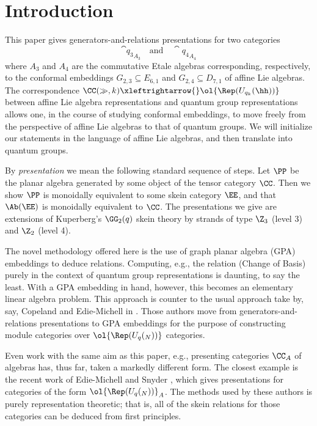\section{Introduction}
This paper gives generators-and-relations presentations for two categories 
\[
    \cat{q_3}_{A_3} \quad \text{and} \quad \cat{q_4}_{A_4}
\] 
where $A_3$ and $A_4$ are the commutative Etale algebras corresponding, respectively, 
to the conformal embeddings $G_{2,3} \subseteq E_{6,1}$ and $G_{2,4} \subseteq D_{7,1}$ 
of affine Lie algebras. 
The correspondence $\CC(\gg,k) \xleftrightarrow{} \ol{\Rep(U_{q_k}(\hh))}$ between 
affine Lie algebra representations and quantum group representations  allows one, 
in the course of studying conformal embeddings, to move freely from the perspective of 
affine Lie algebras to that of quantum groups. 
We will initialize our statements in the language of affine Lie algebras, 
and then translate into quantum groups.

By {\it presentation} we mean the following standard sequence of steps. 
Let $\PP$ be the planar algebra generated by some object of the tensor category $\CC$. 
Then we show $\PP$ is monoidally equivalent to some skein category $\EE$, and that $\Ab(\EE)$ is monoidally equivalent to $\CC$. 
The presentations we give are extensions of Kuperberg's $\GG_2(q)$ skein theory by strands of type $\Z_3$ (level 3) and $\Z_2$ (level 4). 

The novel methodology offered here is the use of graph planar algebra (GPA) embeddings to deduce relations. 
Computing, e.g., the relation (Change of Basis) purely in the context of quantum group representations is daunting, to say the least. 
With a GPA embedding in hand, however, this becomes an elementary linear algebra problem. 
This approach is counter to the usual approach take by, say, Copeland and Edie-Michell in \cite{Cain_Dan}.
Those authors move from generators-and-relations presentations to GPA embeddings for the purpose of 
constructing module categories over $\ol{\Rep(U_q(\sl_N))}$ categories.

Even work with the same aim as this paper, e.g., presenting categories $\CC_A$ of algebras has, thus far,
taken a markedly different form.
The closest example is the recent work of Edie-Michell and Snyder \cite{cain_noah_hans}, which gives presentations 
for categories of the form $\ol{\Rep(U_q(\sl_N))}_A$.
The methods used by these authors is purely representation theoretic;
that is, all of the skein relations for those categories can be deduced from first principles.

